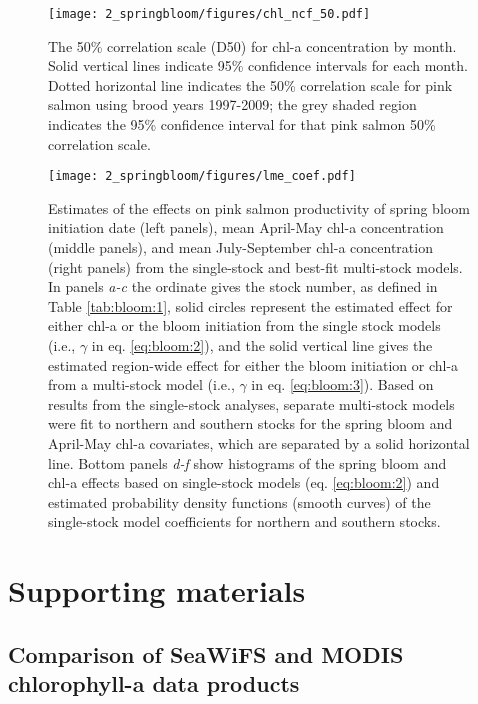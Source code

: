 \begin{figure}[htbp]
  \centering \texttt{[image: 2\_springbloom/figures/chl\_ncf\_50.pdf]}
  \caption[The 50\% correlation scale for chl-a concentration by month.]{The
    50\% correlation scale (D50) for chl-a concentration by month.  Solid
    vertical lines indicate 95\% confidence intervals for each month.
    Dotted horizontal line indicates the 50\% correlation scale for pink salmon
    using brood years 1997-2009; the grey shaded region indicates the 95\%
    confidence interval for that pink salmon 50\% correlation scale.}
  \label{fig:bloom:5}
\end{figure}

\begin{figure}[htbp]
  \centering \texttt{[image: 2\_springbloom/figures/lme\_coef.pdf]}
  \caption[Estimates of the effects on salmon productivity of spring
    bloom initiation date and chl-a concentrations.]{Estimates of the effects on
    pink salmon productivity of spring bloom initiation date (left panels), mean
    April-May chl-a concentration (middle panels), and mean July-September chl-a
    concentration (right panels) from the single-stock and best-fit multi-stock
    models. In panels \emph{a-c} the ordinate gives the stock number, as defined
    in Table \ref{tab:bloom:1}, solid circles represent the estimated effect for
    either chl-a or the bloom initiation from the single stock models (i.e.,
    \(\gamma\) in eq.  \ref{eq:bloom:2}), and the solid vertical line gives the
    estimated region-wide effect for either the bloom initiation or chl-a from a
    multi-stock model (i.e., \(\gamma\) in eq.  \ref{eq:bloom:3}). Based on
    results from the single-stock analyses, separate multi-stock models were fit
    to northern and southern stocks for the spring bloom and April-May chl-a
    covariates, which are separated by a solid horizontal line. Bottom panels
    \emph{d-f} show histograms of the spring bloom and chl-a effects based on
    single-stock models (eq. \ref{eq:bloom:2}) and estimated probability density
    functions (smooth curves) of the single-stock model coefficients for
    northern and southern stocks.}
  \label{fig:bloom:6}
\end{figure}


\newpage
\section{Supporting materials}

\subsection{Comparison of SeaWiFS and MODIS chlorophyll-a data products}
\label{supp:bloom:A}

